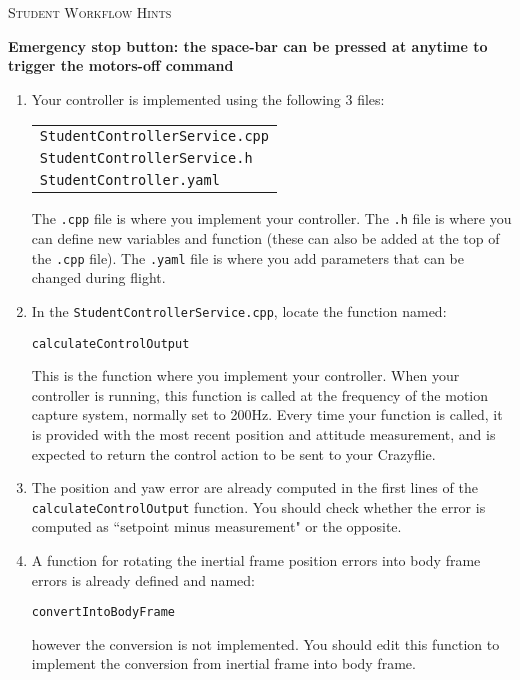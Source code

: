 \documentclass[]{report}
\newcommand{\cppfile}{StudentControllerService.cpp}
\newcommand{\headerfile}{StudentControllerService.h}
\newcommand{\yamlfile}{StudentController.yaml}
\newcommand{\computecontroloutputfunction}{calculateControlOutput}
\newcommand{\convertintobodyframefunction}{convertIntoBodyFrame}
\begin{document}
	
	\begin{center}
		\huge{\textsc{Student Workflow Hints}}
	\end{center}
	
	\begin{center}
		\textbf{Emergency stop button: the space-bar can be pressed at anytime to trigger the motors-off command}
	\end{center}


	\begin{enumerate}[topsep=-1pt , itemsep=1pt ,  label = \textbf{(\arabic{*})} ]
		\item Your controller is implemented using the following 3 files:
		
			\begin{center}
				\begin{tabular}{l}
					\large{\texttt{\cppfile}}
					\\
					\large{\texttt{\headerfile}}
					\\
					\large{\texttt{\yamlfile}}
				\end{tabular}
			\end{center}
		
		The \texttt{.cpp} file is where you implement your controller. The \texttt{.h} file is where you can define new variables and function (these can also be added at the top of the \texttt{.cpp} file). The \texttt{.yaml} file is where you add parameters that can be changed during flight.
		
		\item In the \texttt{\cppfile}, locate the function named:
		\begin{center}
			\large{\texttt{\computecontroloutputfunction}}
		\end{center}
		This is the function where you implement your controller. When your controller is running, this function is called at the frequency of the motion capture system, normally set to 200Hz. Every time your function is called, it is provided with the most recent position and attitude measurement, and is expected to return the control action to be sent to your Crazyflie.
		
		\item The position and yaw error are already computed in the first lines of the \texttt{\computecontroloutputfunction} function. You should check whether the error is computed as ``setpoint minus measurement" or the opposite.
		
		\item A function for rotating the inertial frame position errors into body frame errors is already defined and named:
		\begin{center}
			\large{\texttt{\convertintobodyframefunction}}
		\end{center}
		however the conversion is not implemented. You should edit this function to implement the conversion from inertial frame into body frame.
		

\end{enumerate}
\end{document}

